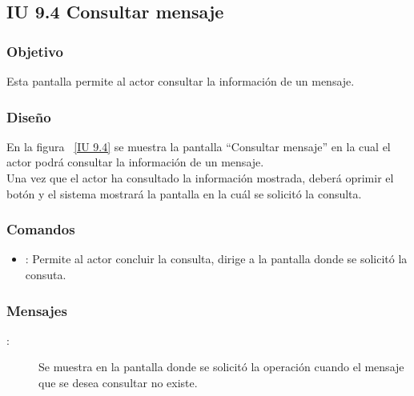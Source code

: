 \subsection{IU 9.4 Consultar mensaje}

\subsubsection{Objetivo}
	
	Esta pantalla permite al actor consultar la información de un mensaje.
	
\subsubsection{Diseño}

    En la figura ~\ref{IU 9.4} se muestra la pantalla ``Consultar mensaje'' en la cual el actor podrá consultar la información de un mensaje.\\
	
	Una vez que el actor ha consultado la información mostrada, deberá oprimir el botón  y el sistema mostrará la pantalla en la cuál se solicitó la consulta.


\subsubsection{Comandos}
\begin{itemize}
	\item {}: Permite al actor concluir la consulta, dirige a la pantalla donde se solicitó la consuta.
\end{itemize}

\subsubsection{Mensajes}
	
\begin{description}
	\item[:] Se muestra en la pantalla donde se solicitó la operación cuando el mensaje que se desea consultar no existe.
\end{description}
